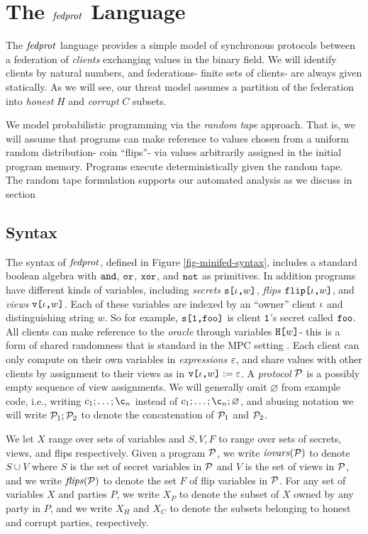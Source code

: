 \section{The $\mathit{fedprot}$ Language}

The $\mathit{fedprot}$ language provides a simple model of synchronous
protocols between a federation of \emph{clients} exchanging values in
the binary field. We will identify clients by natural numbers, and
federations- finite sets of clients- are always given statically.
As we will see, our threat model assumes a partition of the federation
into \emph{honest} $H$ and \emph{corrupt} $C$ subsets.

We model probabilistic programming via the \emph{random tape}
approach. That is, we will assume that programs can make reference to
values chosen from a uniform random distribution- coin ``flips''- via
values arbitrarily assigned in the initial program memory.  Programs
execute deterministically given the random tape. The random tape
formulation supports our automated analysis as we discuss in
section 

\subsection{Syntax} The syntax of $\mathit{fedprot}$, defined in
Figure \ref{fig-minifed-syntax}, includes a standard boolean algebra
with $\texttt{and}$, $\texttt{or}$, $\texttt{xor}$, and $\texttt{not}$ as primitives. In addition
programs have different kinds of variables, including \emph{secrets}
$\texttt{s[}\iota\texttt{,}w\texttt{]}$, \emph{flips} $\texttt{flip[}\iota\texttt{,}w\texttt{]}$, and \emph{views}
$\texttt{v[}\iota\texttt{,}w\texttt{]}$.  Each of these variables are indexed by an ``owner''
client $\iota$ and distinguishing string $w$. So for example,
$\texttt{s[}\texttt{1}\texttt{,}\texttt{foo}\texttt{]}$ is client $\texttt{1}$'s secret called
$\texttt{foo}$. All clients can make reference to the \emph{oracle}
through variables $\texttt{H[}w\texttt{]}$- this is a form of shared randomness
that is standard in the MPC setting \cite{XXX}.  Each client can only
compute on their own variables in \emph{expressions} $\varepsilon$, and share
values with other clients by assignment to their views as in
$\texttt{v[}\iota\texttt{,}w\texttt{]} := \varepsilon$.  A \emph{protocol} $\mathcal{P}$ is a
possibly empty sequence of view assignments. We will generally omit
$\varnothing$ from example code, i.e., writing $c_1;\ldots;\c_n$
instead of $c_1;\ldots;\c_n;\varnothing$, and abusing notation we will
write $\mathcal{P}_1;\mathcal{P}_2$ to denote the concatenation of $\mathcal{P}_1$
and $\mathcal{P}_2$.

We let $X$ range over sets of variables and $S,V,F$ to range over sets
of secrets, views, and flips respectively. Given a program $\mathcal{P}$, we
write $\mathit{iovars}(\mathcal{P})$ to denote $S \cup V$ where $S$ is the set of
secret variables in $\mathcal{P}$ and $V$ is the set of views in $\mathcal{P}$,
and we write $\mathit{flips}(\mathcal{P})$ to denote the set $F$ of flip variables
in $\mathcal{P}$. For any set of variables $X$ and parties $P$, we write
$X_P$ to denote the subset of $X$ owned by any party in $P$, and we
write $X_H$ and $X_C$ to denote the subsets belonging to honest and
corrupt parties, respectively.

